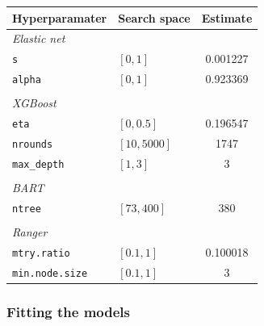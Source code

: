 \documentclass[
]{article}
\newenvironment{Shaded}{\begin{snugshade}}{\end{snugshade}}
\newcommand{\DocumentationTok}[1]{\textcolor[rgb]{0.56,0.35,0.01}{\textbf{\textit{#1}}}}
\newcommand{\FunctionTok}[1]{\textcolor[rgb]{0.00,0.00,0.00}{#1}}
\newcommand{\NormalTok}[1]{#1}
\newcommand{\SpecialCharTok}[1]{\textcolor[rgb]{0.00,0.00,0.00}{#1}}
\begin{document}
\begin{longtable}[]{@{}llc@{}}
\toprule()
\textbf{Hyperparamater} & \textbf{Search space} & \textbf{Estimate} \\
\midrule()
\endhead
\emph{Elastic net} & & \\
\texttt{s} & \([0,1]\) & 0.001227 \\
\texttt{alpha} & \([0,1]\) & 0.923369 \\
& & \\
\emph{XGBoost} & & \\
\texttt{eta} & \([0,0.5]\) & 0.196547 \\
\texttt{nrounds} & \([10,5000]\) & 1747 \\
\texttt{max\_depth} & \([1,3]\) & 3 \\
& & \\
\emph{BART} & & \\
\texttt{ntree} & \([73,400]\) & 380 \\
& & \\
\emph{Ranger} & & \\
\texttt{mtry.ratio} & \([0.1,1]\) & 0.100018 \\
\texttt{min.node.size} & \([0.1,1]\) & 3 \\
\bottomrule()
\end{longtable}

\hypertarget{fitting-the-models-1}{%
\subsubsection{Fitting the models}\label{fitting-the-models-1}}

\begin{Shaded}
\end{Shaded}
\end{document}

